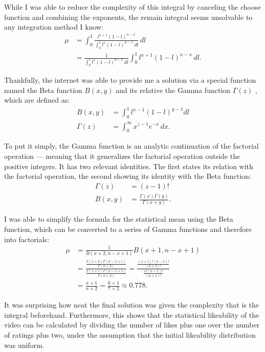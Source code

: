\documentclass[a4paper,11pt]{article}
\begin{document}
While I was able to reduce the complexity of this integral by canceling the choose function and combining the exponents, the remain integral seems unsolvable to any integration method I know:
\begin{align*}
    \mu &=\int_{0}^{1} \frac{ l^{x+1} (1-l)^{n-x}} {\int_{0}^{1} l^x (1-l)^{n-x} \, dl} \, dl\\
    &= \frac{1}{\int_{0}^{1} l^x (1-l)^{n-x} \, dl} \int_{0}^{1}  l^{x+1} (1-l)^{n-x} \, dl.
\end{align*}

Thankfully, the internet was able to provide me a solution via a special function named the Beta function $B(x,y)$ \parencite{wikipedia_2021} and its relative the Gamma function $\Gamma(z)$ \parencite{artin_2006}, which are defined as:
\begin{align*}
    B(x, y) &= \int_{0}^{1} l^{x-1} (1-l)^{y-1} dl\\
    \Gamma(z) &= \int_{0}^{\infty} x^{z-1} e^{-x} \, dx.
\end{align*}

To put it simply, the Gamma function is an analytic continuation of the factorial operation --- meaning that it generalizes the factorial operation outside the positive integers. It has two relevant identities. The first states its relation with the factorial operation, the second showing its identity with the Beta function:
\begin{align*}
    \Gamma(z) &= (z-1)!\\
    B(x, y) &= \frac{\Gamma(x) \Gamma(y)}{\Gamma(x + y)}.
\end{align*}

I was able to simplify the formula for the statistical mean using the Beta function, which can be converted to a series of Gamma functions and therefore into factorials:
\begin{align*}
    \mu &= \frac{1}{B(x+2, n-x+1)}B(x+1, n-x+1)\\
    &= \frac{\frac{\Gamma(x+2)\Gamma(n-x+1)}{\Gamma(n+3)}}{\frac{\Gamma(x+1)\Gamma(n-x+1)}{\Gamma(n+2)}} =  \frac{\frac{(x+1)!(n-x)!}{(n+2)!}}{\frac{x!(n-x)!}{(n+1)!}}\\
    &= \frac{x+1}{n+2} = \frac{6+1}{7+2} \approx 0.778.
\end{align*}

It was surprising how neat the final solution was given the complexity that is the integral beforehand. Furthermore, this shows that the statistical likeability of the video can be calculated by dividing the number of likes plus one over the number of ratings plus two, under the assumption that the initial likeability distribution was uniform.
\end{document}
